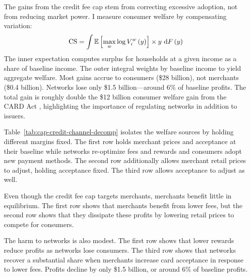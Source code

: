 \documentclass[main.tex]{subfiles}
\begin{document}
The gains from the credit fee cap stem from correcting excessive adoption, not from reducing market power.
I measure consumer welfare by compensating variation:
\begin{equation}
    \text{CS}=\int\mathbb{E}\left[\max_{w}\log V^w_i\left(y\right)\right]\times y\mbox{ d} F\left( y\right)\label{eq:cons-surplus-integral}
\end{equation}
The inner expectation computes surplus for households at a given income as a share of baseline income. The outer integral weights by baseline income to yield aggregate welfare.
Most gains accrue to consumers (\$28 billion), not merchants (\$0.4 billion).
Networks lose only \$1.5 billion---around 6\% of baseline profits.
The total gain is roughly double the \$12 billion consumer welfare gain from the CARD Act \parencite{Agarwal.etal2015}, highlighting the importance of regulating networks in addition to issuers.

Table~\ref{tab:cap-credit-channel-decomp} isolates the welfare sources by holding different margins fixed.
The first row holds merchant prices and acceptance at their baseline while networks re-optimize fees and rewards and consumers adopt new payment methods.
The second row additionally allows merchant retail prices to adjust, holding acceptance fixed.
The third row allows acceptance to adjust as well.

Even though the credit fee cap targets merchants, merchants benefit little in equilibrium.
The first row shows that merchants benefit from lower fees, but the second row shows that they dissipate these profits by lowering retail prices to compete for consumers.

The harm to networks is also modest.
The first row shows that lower rewards reduce profits as networks lose consumers.
The third row shows that networks recover a substantial share when merchants increase card acceptance in response to lower fees.
Profits decline by only \$1.5 billion, or around 6\% of baseline profits.
\end{document}
